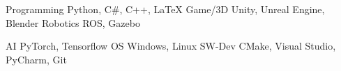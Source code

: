 

\begin{cvskills}

  \cvskillnobreaktwo
    {Programming} %
    {Python, C\#, C++, \LaTeX} %
    {Game/3D} %
    {Unity, Unreal Engine, Blender} %
    {Robotics} %
    {ROS, Gazebo} %



  \cvskillnobreakthree
    {AI} %
    {PyTorch, Tensorflow} %
    {OS} %
    {Windows, Linux} %
    {SW-Dev} %
    {CMake, Visual Studio, PyCharm, Git} %
    


\end{cvskills}
